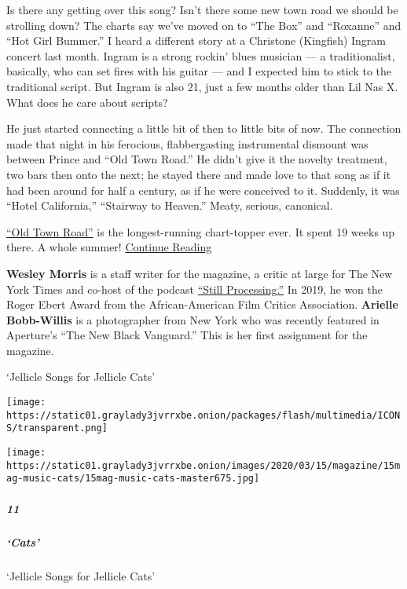 Is there any getting over this song? Isn't there some new town road we
should be strolling down? The charts say we've moved on to ``The Box''
and ``Roxanne'' and ``Hot Girl Bummer.'' I heard a different story at a
Christone (Kingfish) Ingram concert last month. Ingram is a strong
rockin' blues musician --- a traditionalist, basically, who can set
fires with his guitar --- and I expected him to stick to the traditional
script. But Ingram is also 21, just a few months older than Lil Nas X.
What does he care about scripts?

He just started connecting a little bit of then to little bits of now.
The connection made that night in his ferocious, flabbergasting
instrumental dismount was between Prince and ``Old Town Road.'' He
didn't give it the novelty treatment, two bars then onto the next; he
stayed there and made love to that song as if it had been around for
half a century, as if he were conceived to it. Suddenly, it was ``Hotel
California,'' ``Stairway to Heaven.'' Meaty, serious, canonical.

\href{https://www.nytimes3xbfgragh.onion/2019/05/10/arts/music/old-town-road-lil-nas-x.html}{``Old
Town Road''} is the longest-running chart-topper ever. It spent 19 weeks
up there. A whole summer!
\href{https://www.nytimes3xbfgragh.onion/interactive/2020/03/11/magazine/lil-nas-x-old-town-road.html}{Continue
Reading}

\textbf{Wesley Morris} is a staff writer for the magazine, a critic at
large for The New York Times and co-host of the podcast
\href{https://www.nytimes3xbfgragh.onion/column/still-processing-podcast}{``Still
Processing.''} In 2019, he won the Roger Ebert Award from the
African-American Film Critics Association. \textbf{Arielle Bobb-Willis}
is a photographer from New York who was recently featured in Aperture's
``The New Black Vanguard.'' This is her first assignment for the
magazine.

`Jellicle Songs for Jellicle Cats'

\texttt{[image: https://static01.graylady3jvrrxbe.onion/packages/flash/multimedia/ICONS/transparent.png]}

\texttt{[image: https://static01.graylady3jvrrxbe.onion/images/2020/03/15/magazine/15mag-music-cats/15mag-music-cats-master675.jpg]}

\hypertarget{11}{%
\subparagraph{11}\label{11}}

\hypertarget{cats}{%
\subparagraph{`Cats'}\label{cats}}

`Jellicle Songs for Jellicle Cats'

